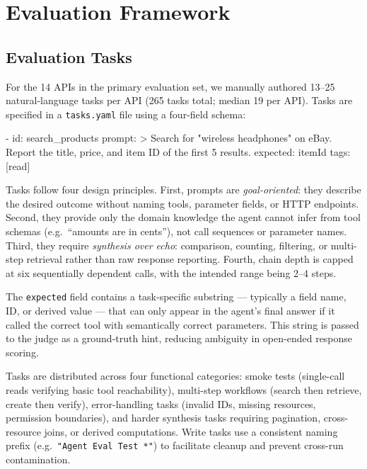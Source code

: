 \section{Evaluation Framework}

\subsection{Evaluation Tasks}

For the 14 APIs in the primary evaluation set, we manually authored 13--25
natural-language tasks per API (265 tasks total; median 19 per API). Tasks
are specified in a \texttt{tasks.yaml} file using a four-field schema:

\begin{YamlBox}
- id: search_products
  prompt: >
    Search for "wireless headphones" on eBay. 
    Report the title, price, and item ID of
    the first 5 results.
  expected: itemId
  tags: [read]
\end{YamlBox}

\noindent
Tasks follow four design principles. First, prompts are \emph{goal-oriented}: they describe the desired outcome without naming tools, parameter fields, or HTTP endpoints. Second, they provide only the domain knowledge the agent cannot infer from tool schemas (e.g.\ ``amounts are in cents''), not call sequences or parameter names. Third, they require \emph{synthesis over echo}: comparison, counting, filtering, or multi-step retrieval rather than raw
response reporting. Fourth, chain depth is capped at six sequentially dependent calls, with the intended range being 2--4 steps.

The \texttt{expected} field contains a task-specific substring --- typically a field name, ID, or derived value --- that can only appear in the agent's final answer if it called the correct tool with semantically correct parameters. This string is passed to the judge as a ground-truth hint, reducing ambiguity in open-ended response scoring.

Tasks are distributed across four functional categories: smoke tests (single-call reads verifying basic tool reachability), multi-step workflows (search then retrieve, create then verify), error-handling tasks (invalid IDs, missing resources, permission boundaries), and harder synthesis tasks requiring pagination, cross-resource joins, or derived computations. Write tasks use a consistent naming prefix (e.g.\ \texttt{"Agent Eval Test *"}) to facilitate cleanup and prevent cross-run contamination.

